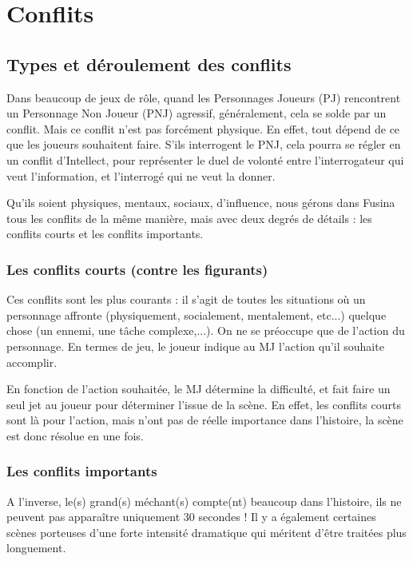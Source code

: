 \chapter{Conflits}

\section{Types et déroulement des conflits}

Dans beaucoup de jeux de rôle, quand les Personnages Joueurs (PJ) rencontrent un Personnage Non Joueur (PNJ) agressif, généralement, cela se solde par un conflit. Mais ce conflit n'est pas forcément physique. En effet, tout dépend de ce que les joueurs souhaitent faire. S'ils interrogent le PNJ, cela pourra se régler en un conflit d'Intellect, pour représenter le duel de volonté entre l'interrogateur qui veut l'information, et l'interrogé qui ne veut la donner.

Qu'ils soient physiques, mentaux, sociaux, d'influence, nous gérons dans Fusina tous les conflits de la même manière, mais avec deux degrés de détails : les conflits courts et les conflits importants.

\subsection{Les conflits courts (contre les figurants)}

Ces conflits sont les plus courants : il s'agit de toutes les situations où un personnage affronte (physiquement, socialement, mentalement, etc...) quelque chose (un ennemi, une tâche complexe,...). On ne se préoccupe que de l'action du personnage. En termes de jeu, le joueur indique au MJ l'action qu'il souhaite accomplir.

En fonction de l'action souhaitée, le MJ détermine la difficulté, et fait faire un seul jet au joueur pour déterminer l'issue de la scène. En effet, les conflits courts sont là pour l'action, mais n'ont pas de réelle importance dans l'histoire, la scène est donc résolue en une fois.

\subsection{Les conflits importants}

A l'inverse, le(s) grand(s) méchant(s) compte(nt) beaucoup dans l'histoire, ils ne peuvent pas apparaître uniquement 30 secondes ! Il y a également certaines scènes porteuses d'une forte intensité dramatique qui méritent d'être traitées plus longuement.

